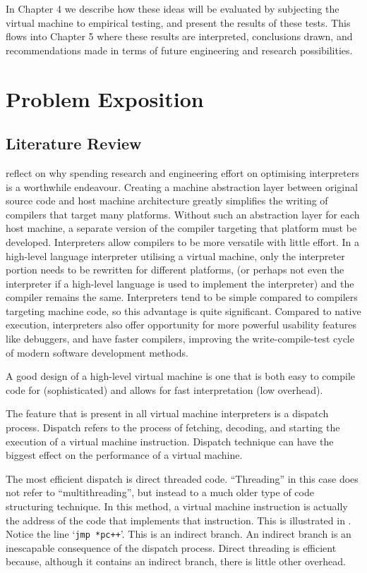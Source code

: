 		In Chapter 4 we describe how these ideas will be evaluated by subjecting the virtual machine to empirical testing, and present the results of these tests. This flows into Chapter 5 where these results are interpreted, conclusions drawn, and recommendations made in terms of future engineering and research possibilities.

\chapter{Problem Exposition}
	\section{Literature Review}
		\cite{structureinterpreters} reflect on why spending research and engineering effort on optimising interpreters is a worthwhile endeavour. Creating a machine abstraction layer between original source code and host machine architecture greatly simplifies the writing of compilers that target many platforms. Without such an abstraction layer for each host machine, a separate version of the compiler targeting that platform must be developed. Interpreters allow compilers to be more versatile with little effort. In a high-level language interpreter utilising a virtual machine, only the interpreter portion needs to be rewritten for different platforms, (or perhaps not even the interpreter if a high-level language is used to implement the interpreter) and the compiler remains the same. Interpreters tend to be simple compared to compilers targeting machine code, so this advantage is quite significant. Compared to native execution, interpreters also offer opportunity for more powerful usability features like debuggers, and have faster compilers, improving the write-compile-test cycle of modern software development methods.
		
		A good design of a high-level virtual machine is one that is both easy to compile code for (sophisticated) and allows for fast interpretation (low overhead).
		
		The feature that is present in all virtual machine interpreters is a dispatch process. Dispatch refers to the process of fetching, decoding, and starting the execution of a virtual machine instruction. Dispatch technique can have the biggest effect on the performance of a virtual machine.
		
		The most efficient dispatch is direct threaded code. ``Threading'' in this case does not refer to ``multithreading'', but instead to a much older type of code structuring technique. In this method, a virtual machine instruction is actually the address of the code that implements that instruction. This is illustrated in . Notice the line `\texttt{jmp *pc++}'. This is an indirect branch. An indirect branch is an inescapable consequence of the dispatch process. Direct threading is efficient because, although it contains an indirect branch, there is little other overhead.
		
